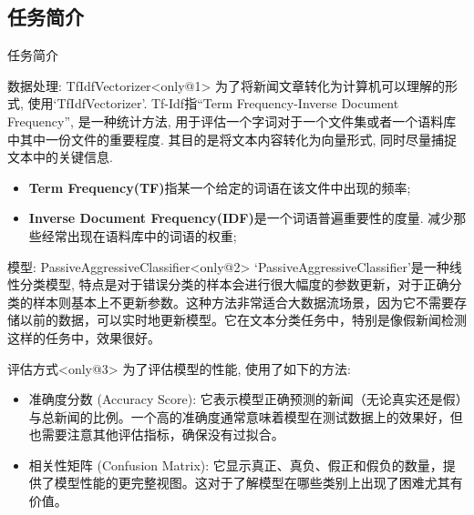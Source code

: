 \documentclass{beamer}
\begin{document}
\subsection{任务简介}
\begin{frame}[fragile]{任务简介}
	\begin{block}{数据处理: TfIdfVectorizer}<only@1>
		为了将新闻文章转化为计算机可以理解的形式, 使用`TfIdfVectorizer'. Tf-Idf指``Term Frequency-Inverse Document Frequency'', 是一种统计方法, 用于评估一个字词对于一个文件集或者一个语料库中其中一份文件的重要程度. 其目的是将文本内容转化为向量形式, 同时尽量捕捉文本中的关键信息.
		\begin{itemize}
			\item \textbf{Term Frequency(TF)}指某一个给定的词语在该文件中出现的频率;
			\item \textbf{Inverse Document Frequency(IDF)}是一个词语普遍重要性的度量. 减少那些经常出现在语料库中的词语的权重;
		\end{itemize}
	\end{block}
	\begin{block}{模型: PassiveAggressiveClassifier}<only@2>
		`PassiveAggressiveClassifier'是一种线性分类模型, 特点是对于错误分类的样本会进行很大幅度的参数更新，对于正确分类的样本则基本上不更新参数。这种方法非常适合大数据流场景，因为它不需要存储以前的数据，可以实时地更新模型。它在文本分类任务中，特别是像假新闻检测这样的任务中，效果很好。
	\end{block}
	\begin{block}{评估方式}<only@3>
		为了评估模型的性能, 使用了如下的方法:
		\begin{itemize}
			\item 准确度分数 (Accuracy Score): 它表示模型正确预测的新闻（无论真实还是假）与总新闻的比例。一个高的准确度通常意味着模型在测试数据上的效果好，但也需要注意其他评估指标，确保没有过拟合。
			\item 相关性矩阵 (Confusion Matrix): 它显示真正、真负、假正和假负的数量，提供了模型性能的更完整视图。这对于了解模型在哪些类别上出现了困难尤其有价值。
		\end{itemize}
	\end{block}
\end{frame}
\end{document}
